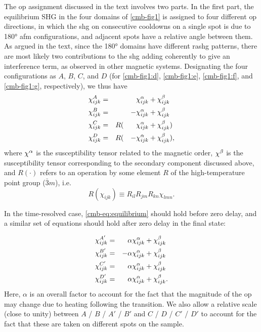 The \gls{op} assignment discussed in the text involves two parts.
In the first part, the equilibrium SHG in the four domains of \cref{cmb-fig1} is assigned to four different \gls{op} directions, in which the \gls{shg} on consecutive cooldowns on a single spot is due to \ang{180} \gls{afm} configurations, and adjacent spots have a relative angle between them.
As argued in the text, since the \ang{180} domains have different \gls{rashg} patterns, there are most likely two contributions to the \gls{shg} adding coherently to give an interference term, as observed in other magnetic systems\citep{fiebig_second_1994, fiebig_second_2001, fiebig_second-harmonic_2005}.
Designating the four configurations as $A$, $B$, $C$, and $D$ (for \cref{cmb-fig1:d}, \cref{cmb-fig1:e}, \cref{cmb-fig1:f}, and \cref{cmb-fig1:g}, respectively), we thus have
\begin{equation}
\begin{aligned}
\label{cmb-eq:equilibrium}
\chi^{A}_{ijk} &= &&&&\chi^\alpha_{ijk}+\chi^\beta_{ijk}\\
\chi^{B}_{ijk} &= &&&-&\chi^\alpha_{ijk}+\chi^\beta_{ijk}\\
\chi^{C}_{ijk} &= &&R(&&\chi^\alpha_{ijk}+\chi^\beta_{ijk})\\
\chi^{D}_{ijk} &= &&R(&-&\chi^\alpha_{ijk}+\chi^\beta_{ijk}),
\end{aligned}
\end{equation}
where $\chi^\alpha$ is the susceptibility tensor related to the magnetic order\citep{fiebig_second-harmonic_2005}, $\chi^\beta$ is the susceptibility tensor corresponding to the secondary component discussed above, and $R(\cdot)$ refers to an operation by some element $R$ of the high-temperature point group ($\bar{3}m$), i.e.
\[
R(\chi_{ijk}) \equiv R_{il}R_{jm}R_{kn}\chi_{lmn}.
\]

In the time-resolved case, \ref{cmb-eq:equilibrium} should hold before zero delay, and a similar set of equations should hold after zero delay in the final state:

\begin{equation}
\begin{aligned}
\label{cmb-eq:nonequilibrium}
\chi^{A'}_{ijk} &= &&\alpha\chi^\alpha_{ijk}+\chi^\beta_{ijk}\\
\chi^{B'}_{ijk} &= &-&\alpha\chi^\alpha_{ijk}+\chi^\beta_{ijk}\\
\chi^{C'}_{ijk} &= &&\alpha\chi^\alpha_{ijk}+\chi^\beta_{ijk}\\
\chi^{D'}_{ijk} &= &&\alpha\chi^\alpha_{ijk}+\chi^\beta_{ijk}.
\end{aligned}
\end{equation}
Here, $\alpha$ is an overall factor to account for the fact that the magnitude of the \gls{op} may change due to heating following the transition.
We also allow a relative scale (close to unity) between $A$ / $B$ / $A'$ / $B'$ and $C$ / $D$ / $C'$ / $D'$ to account for the fact that these are taken on different spots on the sample.

